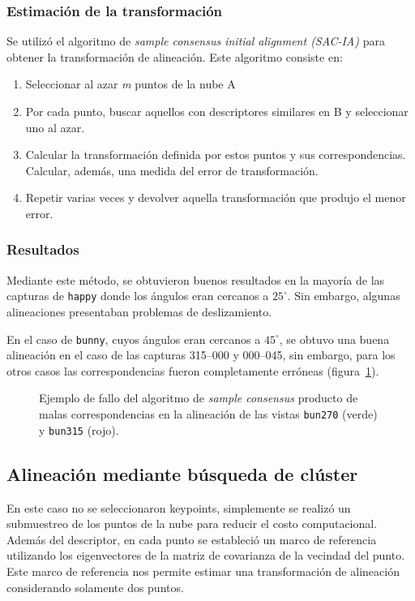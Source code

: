 		\subsubsection{Estimación de la transformación}
			Se utilizó el algoritmo de \emph{sample consensus initial alignment
			(SAC-IA)} para obtener la transformación de alineación. Este algoritmo
			consiste en:
			\begin{enumerate}
				\item Seleccionar al azar \emph{m} puntos de la nube A
				\item Por cada punto, buscar aquellos con descriptores similares en B y seleccionar uno al azar.
				\item Calcular la transformación definida por estos puntos y
					sus correspondencias. Calcular, además, una medida del
					error de transformación.
				\item Repetir varias veces y devolver aquella transformación que produjo el menor error.
			\end{enumerate}

		\subsubsection{Resultados} %
			Mediante este método, se obtuvieron buenos resultados en la mayoría de las
			capturas de \texttt{happy}
			donde los ángulos eran cercanos a $25^{\circ}$.
			Sin embargo, algunas alineaciones presentaban problemas de deslizamiento. 

			En el caso de \texttt{bunny}, cuyos ángulos eran cercanos a $45^{\circ}$,
			se obtuvo una buena alineación en el caso de las capturas 315--000 y 000--045,
			sin embargo, para los otros casos las correspondencias fueron completamente erróneas (figura~\ref{fig:align_sac}).

			\begin{figure}
				\caption{\label{fig:align_sac}Ejemplo de fallo del algoritmo de \emph{sample consensus} producto de malas correspondencias
				en la alineación de las vistas
				\texttt{bun270} (verde) y \texttt{bun315} (rojo).}
			\end{figure}


	\subsection{Alineación mediante búsqueda de clúster}
		En este caso no se seleccionaron keypoints, simplemente se realizó un submuestreo de
		los puntos de la nube para reducir el costo computacional.
		Además del descriptor, en cada punto se estableció un marco de referencia utilizando los
		eigenvectores de la matriz de covarianza de la vecindad del punto. Este
		marco de referencia nos permite estimar
		una transformación de alineación considerando solamente dos puntos\cite{ISS}.

